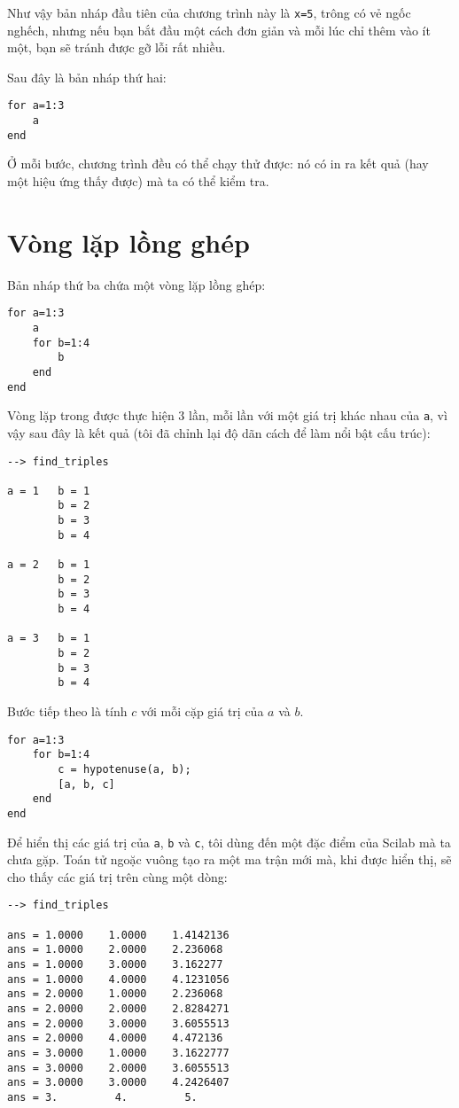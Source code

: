 \documentclass[12pt]{book}
\begin{document}
Như vậy bản nháp đầu tiên của chương trình này là {\tt x=5}, 
trông có vẻ ngốc nghếch, nhưng nếu bạn bắt đầu một cách đơn giản và
mỗi lúc chỉ thêm vào ít một, bạn sẽ tránh được gỡ lỗi rất nhiều.

Sau đây là bản nháp thứ hai:

\begin{verbatim}
for a=1:3
    a
end
\end{verbatim}

Ở mỗi bước, chương trình đều có thể chạy thử được: nó có in ra kết quả
(hay một hiệu ứng thấy được) mà ta có thể kiểm tra.


\section{Vòng lặp lồng ghép}

Bản nháp thứ ba chứa một vòng lặp lồng ghép:

\begin{verbatim}
for a=1:3
    a
    for b=1:4
        b
    end
end
\end{verbatim}

Vòng lặp trong được thực hiện 3 lần, mỗi lần với một giá trị 
khác nhau của {\tt a}, vì vậy sau đây là kết quả (tôi đã chỉnh
lại độ dãn cách để làm nổi bật cấu trúc):

\begin{verbatim}
--> find_triples

a = 1   b = 1
        b = 2
        b = 3
        b = 4

a = 2   b = 1
        b = 2
        b = 3
        b = 4

a = 3   b = 1
        b = 2
        b = 3
        b = 4
\end{verbatim}

Bước tiếp theo là tính $c$ với mỗi cặp giá trị của $a$ và $b$.

\begin{verbatim}
for a=1:3
    for b=1:4
        c = hypotenuse(a, b);
        [a, b, c]
    end
end
\end{verbatim}

Để hiển thị các giá trị của {\tt a}, {\tt b} và {\tt c}, tôi
dùng đến một đặc điểm của Scilab mà ta chưa gặp. Toán tử
ngoặc vuông tạo ra một ma trận mới mà, khi được hiển thị, sẽ
cho thấy các giá trị trên cùng một dòng:

\begin{verbatim}
--> find_triples

ans = 1.0000    1.0000    1.4142136
ans = 1.0000    2.0000    2.236068
ans = 1.0000    3.0000    3.162277
ans = 1.0000    4.0000    4.1231056
ans = 2.0000    1.0000    2.236068
ans = 2.0000    2.0000    2.8284271
ans = 2.0000    3.0000    3.6055513
ans = 2.0000    4.0000    4.472136
ans = 3.0000    1.0000    3.1622777
ans = 3.0000    2.0000    3.6055513
ans = 3.0000    3.0000    4.2426407
ans = 3.         4.         5.
\end{verbatim}
\end{document}
